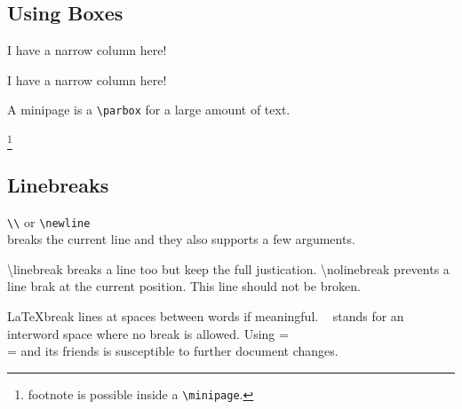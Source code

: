 \documentclass[a4paper,12pt]{article}
\newcommand{\code}[1]{\texttt{#1}}
\begin{document}
\subsection{Using Boxes}

\parbox[t]{1cm}{I have a narrow column here!}
\quad
\parbox[b]{1cm}{I have a narrow column here!}
\quad
\begin{minipage}{3cm}
A minipage is a \code{\textbackslash parbox} for a large amount of text.

\footnote{footnote is possible inside a \code{\textbackslash minipage}.}
\end{minipage}

\subsection{Linebreaks}

\code{\textbackslash\textbackslash} or \code{\textbackslash newline} \\[1cm] breaks the current line
and they also supports a few arguments.

{\textbackslash linebreak} breaks a line too but keep the full justication. {\textbackslash nolinebreak} prevents a line brak at the current position. \nolinebreak[4] \linebreak[1]
This line should not be broken.

\LaTeX break lines at spaces between words if meaningful. \code{~} stands for an interword space where no break is allowed. Using =\\= and its friends is susceptible to further document changes.
\end{document}
